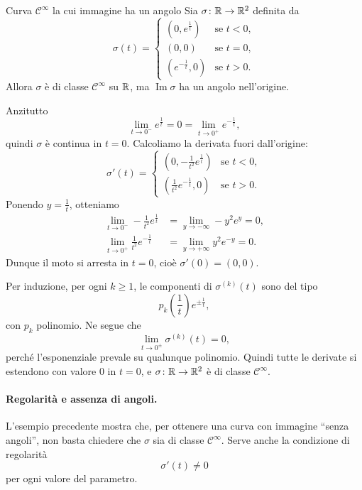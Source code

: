 \documentclass[a4paper]{article}
\begin{document}
\begin{snippetexample}{Curva \(\mathcal{C}^\infty\) la cui immagine ha un angolo}
Sia \(\sigma\colon \mathbb{R} \to \mathbb{R}^2\) definita da
\[
    \sigma(t)=
    \begin{cases}
        \left(0,e^{\frac{1}{t}}\right) & \text{se } t<0,\\
        (0,0) & \text{se } t=0,\\
        \left(e^{-\frac{1}{t}},0\right) & \text{se } t>0.
    \end{cases}
\]
Allora \(\sigma\) è di classe \(\mathcal{C}^\infty\) su \(\mathbb{R}\), ma \(\operatorname{Im}\sigma\) ha un angolo nell'origine.

Anzitutto
\[
    \lim_{t\to 0^-} e^{\frac{1}{t}}=0=\lim_{t\to 0^+} e^{-\frac{1}{t}},
\]
quindi \(\sigma\) è continua in \(t=0\). Calcoliamo la derivata fuori dall'origine:
\[
    \sigma'(t)=
    \begin{cases}
        \left(0,-\frac{1}{t^2}e^{\frac{1}{t}}\right) & \text{se } t<0,\\
        \left(\frac{1}{t^2}e^{-\frac{1}{t}},0\right) & \text{se } t>0.
    \end{cases}
\]
Ponendo \(y=\frac{1}{t}\), otteniamo
\begin{align*}
    \lim_{t\to 0^-} -\frac{1}{t^2}e^{\frac{1}{t}}
    &= \lim_{y\to -\infty} -y^2e^y=0,\\
    \lim_{t\to 0^+} \frac{1}{t^2}e^{-\frac{1}{t}}
    &= \lim_{y\to +\infty} y^2e^{-y}=0.
\end{align*}
Dunque il moto si arresta in \(t=0\), cioè \(\sigma'(0)=(0,0)\).

Per induzione, per ogni \(k\geq 1\), le componenti di \(\sigma^{(k)}(t)\) sono del tipo
\[
    p_k\left(\frac{1}{t}\right)e^{\pm \frac{1}{t}},
\]
con \(p_k\) polinomio. Ne segue che
\[
    \lim_{t\to 0^\pm} \sigma^{(k)}(t)=0,
\]
perché l'esponenziale prevale su qualunque polinomio. Quindi tutte le derivate si estendono con valore \(0\) in \(t=0\), e \(\sigma\colon \mathbb{R}\to \mathbb{R}^2\) è di classe \(\mathcal{C}^\infty\).
\end{snippetexample}

\paragraph{Regolarità e assenza di angoli.}
L'esempio precedente mostra che, per ottenere una curva con immagine ``senza angoli'', non basta chiedere che \(\sigma\) sia di classe \(\mathcal{C}^\infty\). Serve anche la condizione di regolarità
\[
    \sigma'(t)\neq 0
\]
per ogni valore del parametro.
\end{document}
